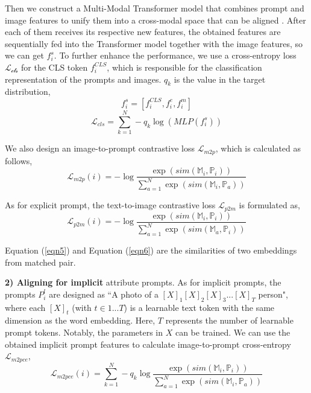 \documentclass[letterpaper]{article} %
\begin{document}
Then we construct a Multi-Modal Transformer model that combines prompt and image features to unify them into a cross-modal space that can be aligned \cite{luo2019bag}. After each of them receives its respective new features, the obtained features are sequentially fed into the Transformer model together with the image features, so we can get ${f}_{i}^{s}$. To further enhance the performance, we use a cross-entropy loss $\mathcal{L_{\text {cls}}}$ for the CLS token ${f}_{i}^{CLS}$, which is responsible for the classification representation of the prompts and images. $q_k$ is the value in the target distribution,
\begin{equation}
{f}_{i}^{s}=[{f}_{i}^{CLS},{f}_{i}^{e},{f}_{i}^{m}]
\end{equation}
\begin{equation}\label{eqn8}
\mathcal{L}_{cls}={\sum_{k=1}^N -q_{k}\log (MLP({f}^{s}_{i}))}
\end{equation}

We also design an image-to-prompt contrastive loss $\mathcal{L}_{m2p}$, which is calculated as follows,
\begin{equation}\label{eqn5}
\mathcal{L}_{m 2 p}(i)=-\log \frac{\exp \left(sim\left(\mathbb{M}_i, \mathbb{P}_i\right)\right)}{\sum_{a=1}^N \exp \left(sim\left(\mathbb{M}_i, \mathbb{P}_a\right)\right)}
\end{equation}

As for explicit prompt, the text-to-image contrastive loss $\mathcal{L}_{{p 2 m}}$ is formulated as,
\begin{equation}\label{eqn6}
\mathcal{L}_{{p 2 m}}(i)=-\log \frac{\exp \left(sim\left(\mathbb{M}_i, \mathbb{P}_i\right)\right)}{\sum_{a=1}^N \exp \left(sim\left(\mathbb{M}_a, \mathbb{P}_i\right)\right)}
\end{equation}

Equation (\ref{eqn5}) and Equation (\ref{eqn6}) are the similarities of two embeddings from matched pair. 

\textbf{2) Aligning for implicit} attribute prompts. As for implicit prompts, the prompts $P_{i}^{l}$ are designed as ``A photo of a $[X]_{1}[X]_{2}[X]_{3}...[X]_{T}$ person", where each $[X]_{t}$ (with $t \in {1...T}$) is a learnable text token with the same dimension as the word embedding. Here, $T$ represents the number of learnable prompt tokens. Notably, the parameters in $X$ can be trained. We can use the obtained implicit prompt features to calculate image-to-prompt cross-entropy $\mathcal{L}_{m2pce}$,
\begin{equation}\label{eqn7}
\mathcal{L}_{m 2 p c e}(i)=\sum_{k=1}^N-q_k \log \frac{\exp \left(sim\left(\mathbb{M}_i, \mathbb{P}_i \right)\right)}{\sum_{a=1}^N \exp \left(sim\left(\mathbb{M}_i, \mathbb{P}_a\right)\right)}
\end{equation}
\end{document}
